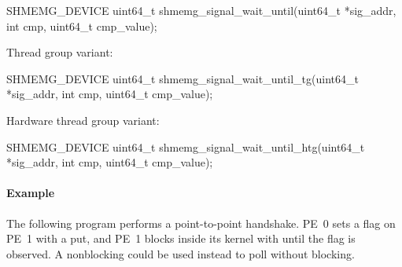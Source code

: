 \begin{apidefinition}
\begin{Csynopsis}
SHMEMG_DEVICE uint64_t shmemg_signal_wait_until(uint64_t *sig_addr,
    int cmp, uint64_t cmp_value);
\end{Csynopsis}

Thread group variant:
\begin{CsynopsisCol}
SHMEMG_DEVICE uint64_t shmemg_signal_wait_until_tg(uint64_t *sig_addr,
    int cmp, uint64_t cmp_value);
\end{CsynopsisCol}

Hardware thread group variant:
\begin{CsynopsisCol}
SHMEMG_DEVICE uint64_t shmemg_signal_wait_until_htg(uint64_t *sig_addr,
    int cmp, uint64_t cmp_value);
\end{CsynopsisCol}

\begin{apiarguments}
\end{apiarguments}


\end{apidefinition}

\paragraph*{\textbf{Example}}\mbox{}\par\nobreak
The following program performs a point-to-point handshake. \ac{PE}~0 sets a flag
on \ac{PE}~1 with a put, and \ac{PE}~1 blocks inside its kernel with
 until the flag is observed. A nonblocking
 could be used instead to poll without blocking.



